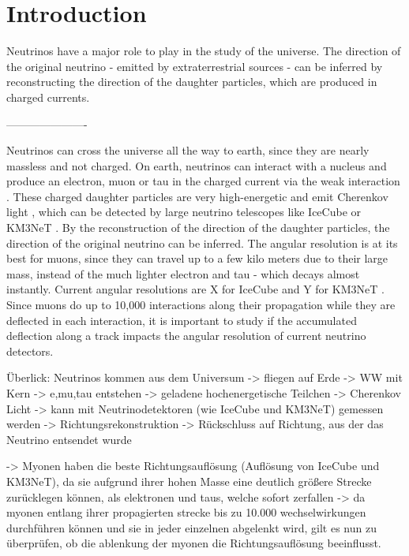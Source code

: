 \section{Introduction}
Neutrinos have a major role to play in the study of the universe. 
The direction of the original 
neutrino - emitted by extraterrestrial sources - can be inferred by 
reconstructing the direction of the daughter 
particles, which are produced in charged currents.

----------------------

Neutrinos can cross the universe all the way to earth, since they are 
nearly massless and not charged. On earth, neutrinos can interact 
with a nucleus and produce an electron, muon or tau in the charged current 
via the weak interaction \cite{}. These charged daughter particles are very 
high-energetic and emit Cherenkov light \cite{}, which can be detected 
by large neutrino telescopes like IceCube \cite{} or KM3NeT \cite{}. 
By the reconstruction of the direction of the daughter particles, the direction 
of the original neutrino can be inferred. The angular resolution is at its 
best for muons, since they can travel up to a few kilo meters due to their 
large mass, instead of the much lighter electron and tau - which decays almost 
instantly. Current angular resolutions are X for IceCube \cite{} and 
Y for KM3NeT \cite{}.
Since muons do up to 10,000 interactions along their propagation while they 
are deflected in each interaction, it is important to study if the accumulated 
deflection along a track impacts the angular resolution of current 
neutrino detectors. 


Überlick: 
Neutrinos kommen aus dem Universum -> fliegen auf Erde -> WW mit Kern 
-> e,mu,tau entstehen -> geladene hochenergetische Teilchen -> Cherenkov Licht 
-> kann mit Neutrinodetektoren (wie IceCube und KM3NeT) gemessen werden 
-> Richtungsrekonstruktion ->
Rückschluss auf Richtung, aus der das Neutrino entsendet wurde

-> Myonen haben die beste Richtungsauflösung (Auflösung von IceCube und KM3NeT), 
da sie aufgrund ihrer hohen Masse 
eine deutlich größere Strecke zurücklegen können, als elektronen und taus, welche 
sofort zerfallen -> da myonen entlang ihrer propagierten strecke bis zu 10.000 
wechselwirkungen durchführen können und sie in jeder einzelnen abgelenkt wird, 
gilt es nun zu überprüfen, ob die ablenkung der myonen die Richtungsauflösung 
beeinflusst.


